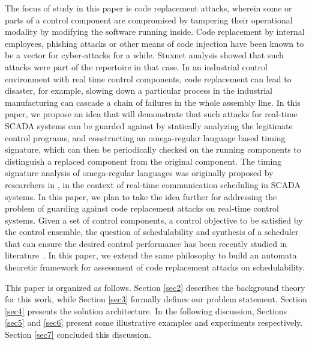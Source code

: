 The focus of study in this paper is code replacement attacks, wherein some or parts of a control component 
are compromised by tampering their operational modality 
by modifying the software running inside. 
Code replacement \cite{GhoshHD12} by internal employees, phishing attacks or other means of code injection
have been known to be a vector for cyber-attacks for a while. Stuxnet analysis showed that such
attacks were part of the repertoire in that case. In an industrial control environment with real time control components, code replacement can lead to disaster, for example, slowing down a
particular process in the industrial manufacturing can cascade a chain of failures in the whole
assembly line. In this paper, we propose an idea that will demonstrate that such
attacks for real-time SCADA systems can be guarded against by statically analyzing the
legitimate control programs, and constructing an omega-regular language based timing signature,
which can then be periodically checked on the running components to distinguish a replaced
component from the original component. The timing signature analysis of omega-regular languages was originally proposed by researchers in \cite{WeissFAA09}, in the context of real-time communication scheduling
in SCADA systems. In this paper, we plan to take the idea further for addressing the problem of guarding against code replacement attacks on real-time control systems. Given a set of control components, a control objective 
to be satisfied by the control ensemble, the question of schedulability and 
synthesis of a scheduler that can ensure the desired control performance has been recently studied in literature~\cite{WeissFAA09, AlurW08, GhoshMDHD16}. 
In this paper, we extend the same philosophy to build an automata theoretic framework for assessment of code replacement attacks on schedulability.

This paper is organized as follows. Section \ref{sec2} describes the background theory for this work, while Section \ref{sec3} formally defines our problem statement. Section \ref{sec4} presents 
the solution architecture. In the following discussion, Sections \ref{sec5} and \ref{sec6} present some illustrative examples and experiments respectively. Section \ref{sec7} concluded this discussion.
